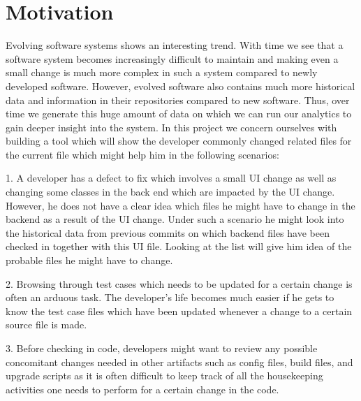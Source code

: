 
\section{Motivation}
\label{sec:motivation}

Evolving software systems shows an interesting trend. With time we see that a software system becomes increasingly difficult to maintain and making even a small change is much more complex in such a system compared to newly developed software. However, evolved software also contains much more historical data and information in their repositories compared to new software. Thus, over time we generate this huge amount of data on which we can run our analytics to gain deeper insight into the system. In this project we concern ourselves with building a tool which will show the developer commonly changed related files for the current file which might help him in the following scenarios:

1. A developer has a defect to fix which involves a small UI change as well as changing some classes in the back end which are impacted by the UI change. However, he does not have a clear idea which files he might have to change in the backend as a result of the UI change. Under such a scenario he might look into the historical data from previous commits on which backend files have been checked in together with this UI file. Looking at the list will give him idea of the probable files he might have to change.

2. Browsing through test cases which needs to be updated for a certain change is often an arduous task. The developer's life becomes much easier if he gets to know the test case files which have been updated whenever a change to a certain source file is made.

3. Before checking in code, developers might want to review any possible concomitant changes needed in other artifacts such as config files, build files, and upgrade scripts as it is often difficult to keep track of all the housekeeping activities one needs to perform for a certain change in the code.